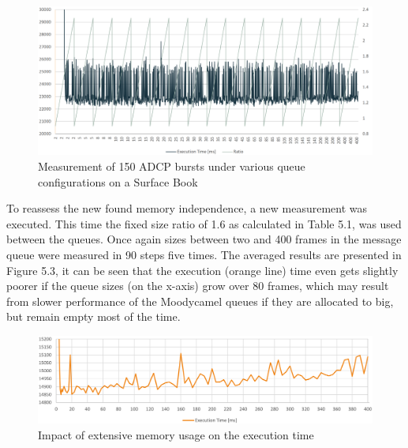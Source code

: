 \begin{figure}[h]
\centering
      \includegraphics[width=1\textwidth]{conf_sb}
        \caption{Measurement of 150 ADCP bursts under various queue configurations on a Surface Book}
\end{figure}

To reassess the new found memory independence, a new measurement was executed. This time the fixed size ratio of 1.6 as calculated in Table 5.1, was used between the queues. Once again sizes between two and 400 frames in the message queue were measured in 90 steps five times. The averaged results are presented in Figure 5.3, it can be seen that the execution (orange line) time even gets slightly poorer if the queue sizes (on the x-axis) grow over 80 frames, which may result from slower performance of the Moodycamel queues if they are allocated to big, but remain empty most of the time.
\vspace{1em}

\begin{figure}[h]
\centering
      \includegraphics[width=1\textwidth]{perf_mem_1}
        \caption{Impact of extensive memory usage on the execution time}
\end{figure}

